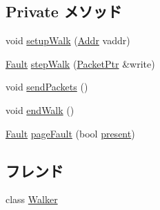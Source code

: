 \subsection*{Private メソッド}
\begin{DoxyCompactItemize}
\item 
void \hyperlink{classX86ISA_1_1Walker_1_1WalkerState_a002ceab720d63ad3e2b3786c1d2285cc}{setupWalk} (\hyperlink{base_2types_8hh_af1bb03d6a4ee096394a6749f0a169232}{Addr} vaddr)
\item 
\hyperlink{classRefCountingPtr}{Fault} \hyperlink{classX86ISA_1_1Walker_1_1WalkerState_a5c46b5cda98378cdb854f6810ee91f8a}{stepWalk} (\hyperlink{classPacket}{PacketPtr} \&write)
\item 
void \hyperlink{classX86ISA_1_1Walker_1_1WalkerState_aa1322bdadbe5c9c04e2151a8317ab35d}{sendPackets} ()
\item 
void \hyperlink{classX86ISA_1_1Walker_1_1WalkerState_a040477c57c479fb61edb65bd58ca19d9}{endWalk} ()
\item 
\hyperlink{classRefCountingPtr}{Fault} \hyperlink{classX86ISA_1_1Walker_1_1WalkerState_aea73109ca1147453cb802d6102c1074a}{pageFault} (bool \hyperlink{namespaceX86ISA_a2c4bc7438a48bd4bbdd7ed9b629a6ec6}{present})
\end{DoxyCompactItemize}
\subsection*{フレンド}
\begin{DoxyCompactItemize}
\item 
class \hyperlink{classX86ISA_1_1Walker_1_1WalkerState_a561951adc2bae72717df4b975c66f02f}{Walker}
\end{DoxyCompactItemize}


